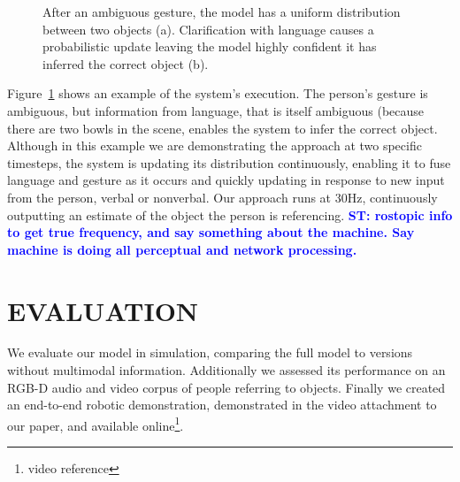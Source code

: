\documentclass[letterpaper, 10 pt, conference]{ieeeconf}
\newcommand{\stnote}[1]{\textcolor{Blue}{\textbf{ST: #1}}}
\begin{document}
\begin{figure}
\centering
{}
\caption{After an ambiguous gesture, the model has a uniform
  distribution between two objects (a).  Clarification with language
  causes a probabilistic update leaving the model highly confident it
  has inferred the correct object (b). \label{fig:cartoon}}
\end{figure}

Figure~\ref{fig:cartoon} shows an example of the system's execution.
The person's gesture is ambiguous, but information from language, that
is itself ambiguous (because there are two bowls in the scene, enables
the system to infer the correct object.  Although in this example we
are demonstrating the approach at two specific timesteps, the system
is updating its distribution continuously, enabling it to fuse
language and gesture as it occurs and quickly updating in response to
new input from the person, verbal or nonverbal.  Our approach runs at
30Hz, continuously outputting an estimate of the object the person is
referencing.  \stnote{rostopic info to get true frequency, and say
  something about the machine.  Say machine is doing all perceptual and network processing.}

\section{EVALUATION}

We evaluate our model in simulation, comparing the full model to
versions without multimodal information.  Additionally we assessed its
performance on an RGB-D audio and video corpus of people referring to
objects.  Finally we created an end-to-end robotic demonstration,
demonstrated in the video attachment to our paper, and available
online\footnote{video reference}. 
\end{document}
